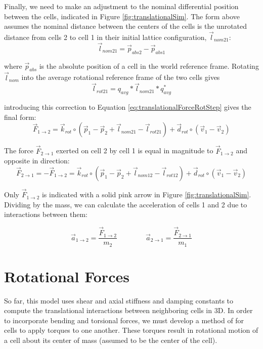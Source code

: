 {Finally, we need to make an adjustment to the nominal differential position between the cells, indicated in Figure \ref{fig:translationalSim}.  The form above assumes the nominal distance between the centers of the cells is the unrotated distance from cells 2 to cell 1 in their initial lattice configuration, $\vec{l}_{nom21}$:
\begin{equation}\label{eq:lnominal}
\vec{l}_{nom21} = \vec{p}_{abs2}-\vec{p}_{abs1}
\end{equation}
 
 where $\vec{p}_{abs}$ is the absolute position of a cell in the world reference frame.
 Rotating $\vec{l}_{nom}$ into the average rotational reference frame of the two cells gives
 \[\vec{l}_{rot21} = q_{avg}*\vec{l}_{nom21}*q_{avg}^*\]
 
introducing this correction to Equation \ref{eq:translationalForceRotStep} gives the final form:
 \begin{equation} \label{eq:translationalForceRot}
  \vec{F}_{1\rightarrow2} = \vec{k}_{rot} \circ (\vec{p}_1 - \vec{p}_2 + \vec{l}_{nom21}-\vec{l}_{rot21}) + \vec{d}_{rot} \circ (\vec{v}_1 - \vec{v}_2)
  \end{equation}

The force $\vec{F}_{2\rightarrow1}$ exerted on cell 2 by cell 1 is equal in magnitude to $\vec{F}_{1\rightarrow2}$ and opposite in direction:
 \begin{equation} \label{eq:translationalEqOpp}
  \vec{F}_{2\rightarrow1} = -\vec{F}_{1\rightarrow2} = \vec{k}_{rot} \circ (\vec{p}_1 - \vec{p}_2 + \vec{l}_{nom12}-\vec{l}_{rot12}) + \vec{d}_{rot} \circ (\vec{v}_1 - \vec{v}_2)
  \end{equation}

Only $\vec{F}_{1\rightarrow2}$ is indicated with a solid pink arrow in Figure \ref{fig:translationalSim}.\\

Dividing by the mass, we can calculate the acceleration of cells 1 and 2 due to interactions between them:

 \[ \vec{a}_{1\rightarrow2} = \dfrac{\vec{F}_{1\rightarrow2}}{m_2} 
  \qquad\qquad
   \vec{a}_{2\rightarrow1} = \dfrac{\vec{F}_{2\rightarrow1}}{m_1} 
  \]

\section{Rotational Forces}

So far, this model uses shear and axial stiffness and damping constants to compute the translational interactions between neighboring cells in 3D.  In order to incorporate bending and torsional forces, we must develop a method of for cells to apply torques to one another.  These torques result in rotational motion of a cell about its center of mass (assumed to be the center of the cell).\\

}
